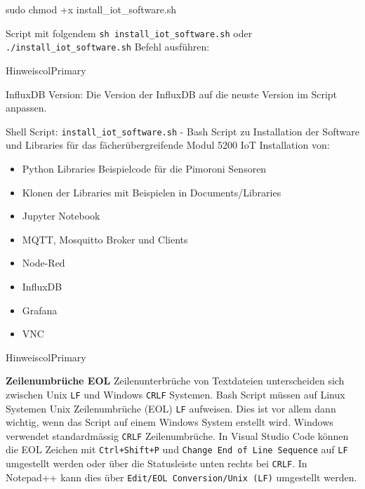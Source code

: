 \documentclass[
  11pt,
  a4paperpaper,
  oneside, openany  ,captions=tableheading
]{scrbook}
\newenvironment{Shaded}{\begin{snugshade}}{\end{snugshade}}
\newcommand{\FunctionTok}[1]{\textcolor[rgb]{0.28,0.35,0.67}{#1}}
\newcommand{\NormalTok}[1]{\textcolor[rgb]{0.00,0.23,0.31}{#1}}
\providecommand{\tightlist}{%
  \setlength{\itemsep}{0pt}\setlength{\parskip}{0pt}}
\theoremstyle{definition}
\theoremstyle{remark}
\begin{document}
\begin{Shaded}
\begin{Highlighting}[]
\FunctionTok{sudo}\NormalTok{ chmod +x install\_iot\_software.sh}
\end{Highlighting}
\end{Shaded}

Script mit folgendem \texttt{sh\ install\_iot\_software.sh} oder
\texttt{./install\_iot\_software.sh} Befehl ausführen:

\begin{boxtitle}{Hinweis}{colPrimary}

InfluxDB Version: Die Version der InfluxDB auf die neuste Version im
Script anpassen.

\end{boxtitle}

Shell Script: \texttt{install\_iot\_software.sh} - Bash Script zu
Installation der Software und Libraries für das fächerübergreifende
Modul 5200 IoT Installation von:

\begin{itemize}
\tightlist
\item
  Python Libraries Beispielcode für die Pimoroni Sensoren
\item
  Klonen der Libraries mit Beispielen in Documents/Libraries
\item
  Jupyter Notebook
\item
  MQTT, Mosquitto Broker und Clients
\item
  Node-Red
\item
  InfluxDB
\item
  Grafana
\item
  VNC
\end{itemize}

\begin{boxtitle}{Hinweis}{colPrimary}

\textbf{Zeilenumbrüche EOL} Zeilenunterbrüche von Textdateien
unterscheiden sich zwischen Unix \texttt{LF} und Windows \texttt{CRLF}
Systemen. Bash Script müssen auf Linux Systemen Unix Zeilenumbrüche
(EOL) \texttt{LF} aufweisen. Dies ist vor allem dann wichtig, wenn das
Script auf einem Windows System erstellt wird. Windows verwendet
standardmässig \texttt{CRLF} Zeilenumbrüche. In Visual Studio Code
können die EOL Zeichen mit \texttt{Ctrl+Shift+P} und
\texttt{Change\ End\ of\ Line\ Sequence} auf \texttt{LF} umgestellt
werden oder über die Statusleiste unten rechts bei \texttt{CRLF}. In
Notepad++ kann dies über \texttt{Edit/EOL\ Conversion/Unix\ (LF)}
umgestellt werden.

\end{boxtitle}
\end{document}
